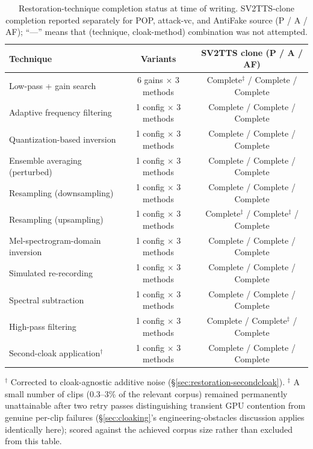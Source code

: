\documentclass[11pt]{article}
\begin{document}
\begin{table}[H]
\centering
\caption{Restoration-technique completion status at time of writing.
SV2TTS-clone completion reported separately for POP, attack-vc, and
AntiFake source (P / A / AF); ``---'' means that (technique,
cloak-method) combination was not attempted.}
\label{tab:restoration-status}
\begin{tabular}{lcc}
\toprule
Technique & Variants & SV2TTS clone (P / A / AF) \\
\midrule
Low-pass + gain search         & 6 gains $\times$ 3 methods & Complete$^\ddagger$ / Complete / Complete \\
Adaptive frequency filtering   & 1 config $\times$ 3 methods & Complete / Complete / Complete \\
Quantization-based inversion   & 1 config $\times$ 3 methods & Complete / Complete / Complete \\
Ensemble averaging (perturbed) & 1 config $\times$ 3 methods & Complete / Complete / Complete \\
Resampling (downsampling)      & 1 config $\times$ 3 methods & Complete / Complete / Complete \\
Resampling (upsampling)        & 1 config $\times$ 3 methods & Complete$^\ddagger$ / Complete$^\ddagger$ / Complete \\
Mel-spectrogram-domain inversion & 1 config $\times$ 3 methods & Complete / Complete / Complete \\
Simulated re-recording         & 1 config $\times$ 3 methods & Complete / Complete / Complete \\
Spectral subtraction           & 1 config $\times$ 3 methods & Complete / Complete / Complete \\
High-pass filtering            & 1 config $\times$ 3 methods & Complete / Complete$^\ddagger$ / Complete \\
Second-cloak application$^\dagger$ & 1 config $\times$ 3 methods & Complete / Complete / Complete \\
\bottomrule
\end{tabular}

\vspace{0.2em}
\footnotesize $^\dagger$ Corrected to cloak-agnostic additive noise
(\S\ref{sec:restoration-secondcloak}). $^\ddagger$ A small number of
clips (0.3--3\% of the relevant corpus) remained permanently
unattainable after two retry passes distinguishing transient GPU
contention from genuine per-clip failures (\S\ref{sec:cloaking}'s
engineering-obstacles discussion applies identically here); scored
against the achieved corpus size rather than excluded from this table.
\end{table}
\end{document}
